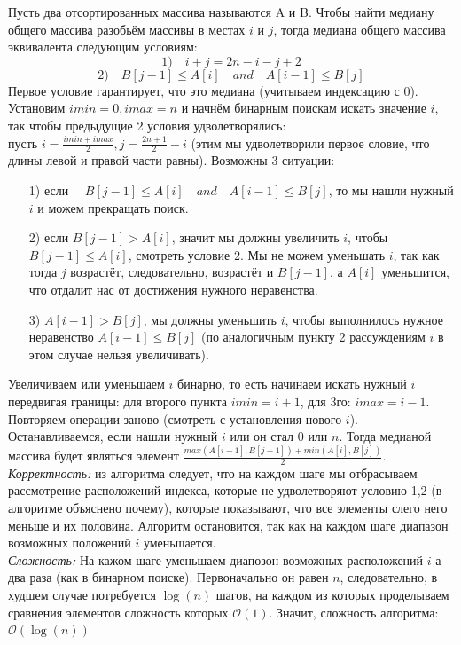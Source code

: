 \documentclass[a4paper,12pt]{article} %
\begin{document}
Пусть два отсортированных массива называются A и B. Чтобы найти медиану общего массива разобьём массивы в местах $ i $ и $ j $, тогда медиана общего массива эквивалента следующим условиям: 
$$
1) \quad i + j = 2n - i - j + 2
$$
$$
2) \quad B[j - 1] \leq A[i] \quad and \quad A[i - 1] \leq B[j]
$$
Первое условие гарантирует, что это медиана (учитываем индексацию с 0). Установим $ imin = 0, imax = n $ и начнём бинарным поискам искать значение $ i $, так чтобы предыдущие 2 условия удволетворялись:\\
пусть $ i = \frac{imin + imax}{2}, j = \frac{2n + 1}{2} - i $ (этим мы удволетворили первое словие, что длины левой и правой части равны). Возможны 3 ситуации:
\begin{itemize}
\item[1)] если $ \quad B[j - 1] \leq A[i] \quad and \quad A[i - 1] \leq B[j] $, то мы нашли нужный $ i $ и можем прекращать поиск.
\item[2)] если $ B[j - 1] > A[i] $, значит мы должны увеличить $ i $, чтобы $ B[j - 1] \leq A[i] $, смотреть условие 2. Мы не можем уменьшать $i$, так как тогда $ j $ возрастёт, следовательно, возрастёт и $ B[j-1] $, а $ A[i] $ уменьшится, что отдалит нас от достижения нужного неравенства.
\item[3)] $ A[i - 1] > B[j] $, мы должны уменьшить $ i $, чтобы выполнилось нужное неравенство $ A[i - 1] \leq B[j] $ (по аналогичным пункту 2 рассуждениям $ i $ в этом случае нельзя увеличивать).
\end{itemize} 
Увеличиваем или уменьшаем $ i $ бинарно, то есть начинаем искать нужный $ i $ передвигая границы: для второго пункта $ imin = i + 1 $, для 3го: $ imax = i - 1 $. Повторяем операции заново (смотреть с установления нового $ i $).\\
Останавливаемся, если нашли нужный $ i $ или он стал $ 0 $ или $ n $. Тогда медианой массива будет являться элемент $\frac{max \left( A[i - 1], B[j - 1] \right) + min \left( A[i], B[j] \right) }{2}  $.\\

\textit{Корректность:} из алгоритма следует, что на каждом шаге мы отбрасываем рассмотрение расположений индекса, которые не удволетворяют условию 1,2 (в алгоритме объяснено почему), которые показывают, что все элементы слего него меньше и их половина. Алгоритм остановится, так как на каждом шаге диапазон возможных положений $ i $ уменьшается.\\

\textit{Сложность:} На кажом шаге уменьшаем диапозон возможных расположений $ i $ а два раза (как в бинарном поиске). Первоначально он равен $ n $, следовательно, в худшем случае потребуется $ \log(n) $ шагов, на каждом из которых проделываем сравнения элементов сложность которых $ \mathcal{O}(1) $. Значит, сложность алгоритма:  $ \mathcal{O}(\log(n)) $ 
\end{document}

